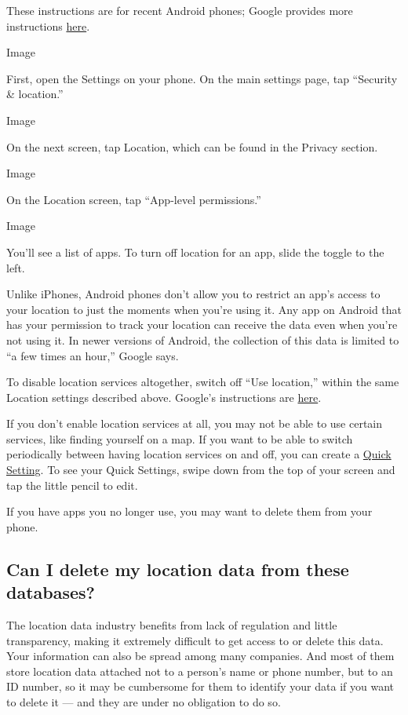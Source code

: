 These instructions are for recent Android phones; Google provides more
instructions
\href{https://support.google.com/android/answer/6179507}{here}.

Image

First, open the Settings on your phone. On the main settings page, tap
``Security \& location.''

Image

On the next screen, tap Location, which can be found in the Privacy
section.

Image

On the Location screen, tap ``App-level permissions.''

Image

You'll see a list of apps. To turn off location for an app, slide the
toggle to the left.

Unlike iPhones, Android phones don't allow you to restrict an app's
access to your location to just the moments when you're using it. Any
app on Android that has your permission to track your location can
receive the data even when you're not using it. In newer versions of
Android, the collection of this data is limited to ``a few times an
hour,'' Google says.

To disable location services altogether, switch off ``Use location,''
within the same Location settings described above. Google's instructions
are
\href{https://support.google.com/accounts/answer/3467281?hl=en}{here}.

If you don't enable location services at all, you may not be able to use
certain services, like finding yourself on a map. If you want to be able
to switch periodically between having location services on and off, you
can create a
\href{https://support.google.com/android/answer/9083864}{Quick Setting}.
To see your Quick Settings, swipe down from the top of your screen and
tap the little pencil to edit.

If you have apps you no longer use, you may want to delete them from
your phone.

\hypertarget{can-i-delete-my-location-data-from-these-databases}{%
\subsection{Can I delete my location data from these
databases?}\label{can-i-delete-my-location-data-from-these-databases}}

The location data industry benefits from lack of regulation and little
transparency, making it extremely difficult to get access to or delete
this data. Your information can also be spread among many companies. And
most of them store location data attached not to a person's name or
phone number, but to an ID number, so it may be cumbersome for them to
identify your data if you want to delete it --- and they are under no
obligation to do so.

